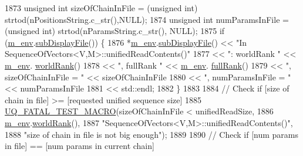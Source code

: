 \begin{DoxyCode}
1873               \textcolor{keywordtype}{unsigned} \textcolor{keywordtype}{int} sizeOfChainInFile = (\textcolor{keywordtype}{unsigned} int) strtod(nPositionsString.c\_str(),NULL);
1874               \textcolor{keywordtype}{unsigned} \textcolor{keywordtype}{int} numParamsInFile   = (\textcolor{keywordtype}{unsigned} int) strtod(nParamsString.c\_str(),   NULL);
1875               \textcolor{keywordflow}{if} (\hyperlink{class_q_u_e_s_o_1_1_base_vector_sequence_a8e8824d2a63c5a43bcc6473e3a0491e8}{m\_env}.\hyperlink{class_q_u_e_s_o_1_1_base_environment_a8a0064746ae8dddfece4229b9ad374d6}{subDisplayFile}()) \{
1876                 *\hyperlink{class_q_u_e_s_o_1_1_base_vector_sequence_a8e8824d2a63c5a43bcc6473e3a0491e8}{m\_env}.\hyperlink{class_q_u_e_s_o_1_1_base_environment_a8a0064746ae8dddfece4229b9ad374d6}{subDisplayFile}() << \textcolor{stringliteral}{"In
       SequenceOfVectors<V,M>::unifiedReadContents()"}
1877                                         << \textcolor{stringliteral}{": worldRank "}           << \hyperlink{class_q_u_e_s_o_1_1_base_vector_sequence_a8e8824d2a63c5a43bcc6473e3a0491e8}{m\_env}.
      \hyperlink{class_q_u_e_s_o_1_1_base_environment_a78b57112bbd0e6dd0e8afec00b40ffa7}{worldRank}()
1878                                         << \textcolor{stringliteral}{", fullRank "}            << \hyperlink{class_q_u_e_s_o_1_1_base_vector_sequence_a8e8824d2a63c5a43bcc6473e3a0491e8}{m\_env}.
      \hyperlink{class_q_u_e_s_o_1_1_base_environment_a84a239e42ae443cf71db6e03e8159620}{fullRank}()
1879                                         << \textcolor{stringliteral}{", sizeOfChainInFile = "} << sizeOfChainInFile
1880                                         << \textcolor{stringliteral}{", numParamsInFile = "}   << numParamsInFile
1881                                         << std::endl;
1882               \}
1883 
1884               \textcolor{comment}{// Check if [size of chain in file] >= [requested unified sequence size]}
1885               \hyperlink{_defines_8h_a56d63d18d0a6d45757de47fcc06f574d}{UQ\_FATAL\_TEST\_MACRO}(sizeOfChainInFile < unifiedReadSize,
1886                                   \hyperlink{class_q_u_e_s_o_1_1_base_vector_sequence_a8e8824d2a63c5a43bcc6473e3a0491e8}{m\_env}.\hyperlink{class_q_u_e_s_o_1_1_base_environment_a78b57112bbd0e6dd0e8afec00b40ffa7}{worldRank}(),
1887                                   \textcolor{stringliteral}{"SequenceOfVectors<V,M>::unifiedReadContents()"},
1888                                   \textcolor{stringliteral}{"size of chain in file is not big enough"});
1889 
1890               \textcolor{comment}{// Check if [num params in file] == [num params in current chain]}

\end{DoxyCode}
